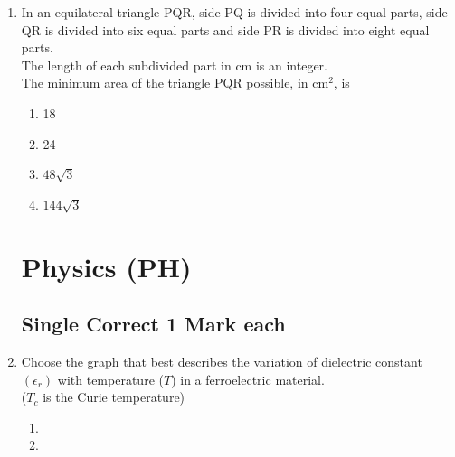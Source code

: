 \documentclass[journal]{IEEEtran}
\begin{document}
\begin{enumerate}
\item In an equilateral triangle PQR, side PQ is divided into four equal parts, side QR is divided into six equal parts and side PR is divided into eight equal parts.\\
The length of each subdivided part in cm is an integer.\\
The minimum area of the triangle PQR possible, in cm$^2$, is
\begin{multicols}{2}
    \begin{enumerate}
        \item 18
        \item 24
        \item $48 \sqrt{3}$
        \item $144 \sqrt{3}$
    \end{enumerate}
\end{multicols}

\section*{Physics (PH)}
\subsection*{Single Correct 1 Mark each}
\item Choose the graph that best describes the variation of dielectric constant $(\epsilon_r)$ with temperature ($T$) in a ferroelectric material.\\
($T_c$ is the Curie temperature)
\begin{multicols}{2}
    \begin{enumerate}
        \item {}

        \item {}
\end{enumerate}
\end{multicols}
\end{enumerate}
\end{document}

